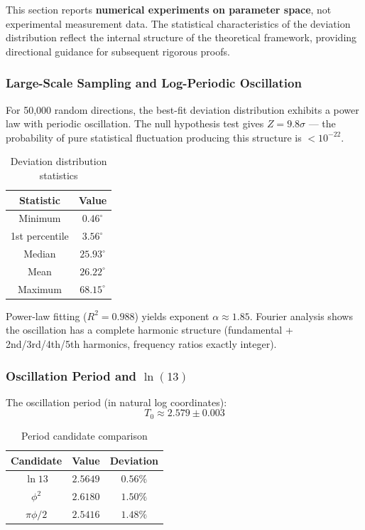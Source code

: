 \begin{remark}
This section reports \textbf{numerical experiments on parameter space}, not experimental measurement data. The statistical characteristics of the deviation distribution reflect the internal structure of the theoretical framework, providing directional guidance for subsequent rigorous proofs.
\end{remark}

\subsubsection{Large-Scale Sampling and Log-Periodic Oscillation}

For 50,000 random directions, the best-fit deviation distribution exhibits a power law with periodic oscillation. The null hypothesis test gives $Z = 9.8\sigma$ --- the probability of pure statistical fluctuation producing this structure is $< 10^{-22}$.

\begin{table}[htbp]
\centering
\caption{Deviation distribution statistics}
\label{tab:deviation_stats_en}
\begin{tabular}{cc}
\hline
Statistic & Value \\
\hline
Minimum & $0.46^\circ$ \\
1st percentile & $3.56^\circ$ \\
Median & $25.93^\circ$ \\
Mean & $26.22^\circ$ \\
Maximum & $68.15^\circ$ \\
\hline
\end{tabular}
\end{table}

Power-law fitting ($R^2 = 0.988$) yields exponent $\alpha \approx 1.85$. Fourier analysis shows the oscillation has a complete harmonic structure (fundamental + 2nd/3rd/4th/5th harmonics, frequency ratios exactly integer).

\subsubsection{Oscillation Period and $\ln(13)$}

The oscillation period (in natural log coordinates):
\begin{equation}
T_0 \approx 2.579 \pm 0.003
\end{equation}

\begin{table}[htbp]
\centering
\caption{Period candidate comparison}
\label{tab:period_candidates_en}
\begin{tabular}{ccc}
\hline
Candidate & Value & Deviation \\
\hline
$\ln 13$ & $2.5649$ & $0.56\%$ \\
$\phi^2$ & $2.6180$ & $1.50\%$ \\
$\pi\phi/2$ & $2.5416$ & $1.48\%$ \\
\hline
\end{tabular}
\end{table}

